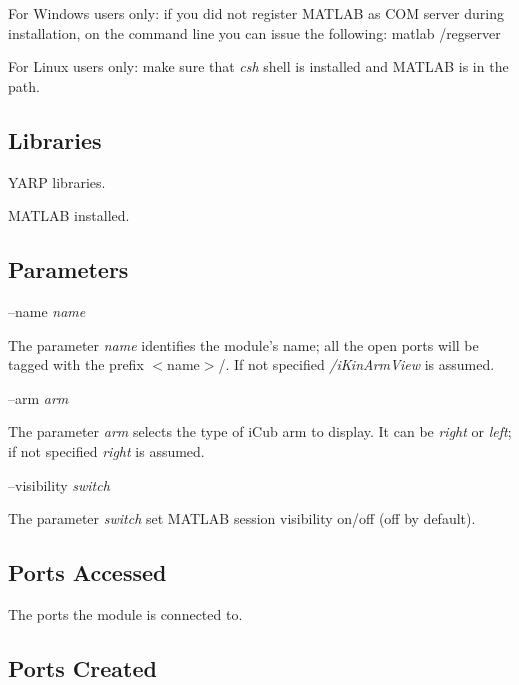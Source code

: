 For Windows users only\+: if you did not register M\+A\+T\+L\+A\+B as C\+O\+M server during installation, on the command line you can issue the following\+: matlab /regserver

For Linux users only\+: make sure that {\itshape csh} shell is installed and M\+A\+T\+L\+A\+B is in the path.\hypertarget{group__icub__tld_lib_sec}{}\subsection{Libraries}\label{group__icub__tld_lib_sec}

\begin{DoxyItemize}
\item Y\+A\+R\+P libraries.
\item M\+A\+T\+L\+A\+B installed.
\end{DoxyItemize}\hypertarget{group__icub__tld_parameters_sec}{}\subsection{Parameters}\label{group__icub__tld_parameters_sec}
--name {\itshape name} 
\begin{DoxyItemize}
\item The parameter {\itshape name} identifies the module's name; all the open ports will be tagged with the prefix $<$name$>$/. If not specified {\itshape /i\+Kin\+Arm\+View} is assumed.
\end{DoxyItemize}

--arm {\itshape arm} 
\begin{DoxyItemize}
\item The parameter {\itshape arm} selects the type of i\+Cub arm to display. It can be {\itshape right} or {\itshape left}; if not specified {\itshape right} is assumed.
\end{DoxyItemize}

--visibility {\itshape switch} 
\begin{DoxyItemize}
\item The parameter {\itshape switch} set M\+A\+T\+L\+A\+B session visibility on/off (off by default).
\end{DoxyItemize}\hypertarget{group__icub__signalScope_portsa_sec}{}\subsection{Ports Accessed}\label{group__icub__signalScope_portsa_sec}
The ports the module is connected to.\hypertarget{group__icub__tld_portsc_sec}{}\subsection{Ports Created}\label{group__icub__tld_portsc_sec}

